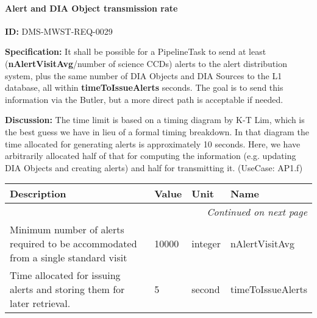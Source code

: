 \documentclass[SE,toc,lsstdraft]{lsstdoc}
\makeatletter
\newcommand{\paramname}[1]{\hspace{0pt}#1}
\newcommand{\unitname}[1]{\hspace{0pt}#1}
\newcommand{\addendum}{}
\newenvironment{parameters}[0]{%
\setlength\LTleft{0pt}
\setlength\LTright{\fill}
\begin{small}
\begin{longtable}[]{|p{0.49\textwidth}|l|p{0.6in}|p{1.70in}@{}|}

\hline \textbf{Description} & \textbf{Value} & \textbf{Unit} & \textbf{Name} \\ \hline
\endhead

\hline \multicolumn{4}{r}{\emph{Continued on next page}} \\
\endfoot

\hline\hline
\endlastfoot
}{%
\hline
\end{longtable}
\end{small}
}
\makeatother
\begin{document}
\paragraph{Alert and DIA Object transmission rate}\hfill  %

\label{DMS-MWST-REQ-0029}
\textbf{ID:} DMS-MWST-REQ-0029

\textbf{Specification:}
It shall be possible for a PipelineTask to send at least (\textbf{nAlertVisitAvg}/number of science CCDs) alerts to the alert distribution system, plus the same number of DIA Objects and DIA Sources to the L1 database, all within \textbf{timeToIssueAlerts} seconds. The goal is to send this information via the Butler, but a more direct path is acceptable if needed.

\textbf{Discussion:}
The time limit is based on a timing diagram by K-T Lim, which is the best guess we have in lieu of a formal timing breakdown. In that diagram the time allocated for generating alerts is approximately 10 seconds. Here, we have arbitrarily allocated half of that for computing the information (e.g. updating DIA Objects and creating alerts) and half for transmitting it. (UseCase: AP1.f)

\begin{parameters}
Minimum number of alerts required to be accommodated from a single standard visit
&
10000
&
\unitname{%
integer
}
&
\paramname{%
nAlertVisitAvg
} \\\hline
Time allocated for issuing alerts and storing them for later retrieval.
&
5
&
\unitname{%
second
}
&
\paramname{%
timeToIssueAlerts
} \\\hline
\end{parameters}

\addendum


\end{document}
